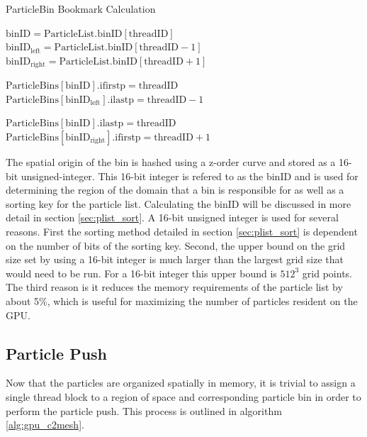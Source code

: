 \begin{algorithm}
	\caption{ParticleBin Bookmark Calculation}
	\label{alg:count_bins}
	\begin{algorithmic}
			\STATE 
			\STATE $\mathrm{binID} = \mathrm{ParticleList.binID}[\mathrm{threadID}]$
			\STATE $\mathrm{binID_{left}} = \mathrm{ParticleList.binID}[\mathrm{threadID} - 1]$
			\STATE $\mathrm{binID_{right}} = \mathrm{ParticleList.binID}[\mathrm{threadID} + 1]$
			
				\STATE $\mathrm{ParticleBins[binID].ifirstp} = \mathrm{threadID}$
				\STATE $\mathrm{ParticleBins[binID_{left}].ilastp} = \mathrm{threadID} - 1$
			\ENDIF

				\STATE $\mathrm{ParticleBins[binID].ilastp} = \mathrm{threadID}$
				\STATE $\mathrm{ParticleBins[binID_{right}].ifirstp} = \mathrm{threadID} + 1$	
			\ENDIF
			
		\ENDFOR
	\end{algorithmic}
\end{algorithm}


The spatial origin of the bin is hashed using a z-order curve and stored as a 16-bit unsigned-integer. This 16-bit integer is refered to as the binID and is used for determining the region of the domain that a bin is responsible for as well as a sorting key for the particle list. Calculating the binID will be discussed in more detail in section \ref{sec:plist_sort}. A 16-bit unsigned integer is used for several reasons. First the sorting method detailed in section \ref{sec:plist_sort} is dependent on the number of bits of the sorting key. Second, the upper bound on the grid size set by using a 16-bit integer is much larger than the largest grid size that would need to be run. For a 16-bit integer this upper bound is $512^3$ grid points. The third reason is it reduces the memory requirements of the particle list by about 5\%, which is useful for maximizing the number of particles resident on the GPU. 

	\subsection{Particle Push}
Now that the particles are organized spatially in memory, it is trivial to assign a single thread block to a region of space and corresponding particle bin in order to perform the particle push. This process is outlined in algorithm \ref{alg:gpu_c2mesh}. 

